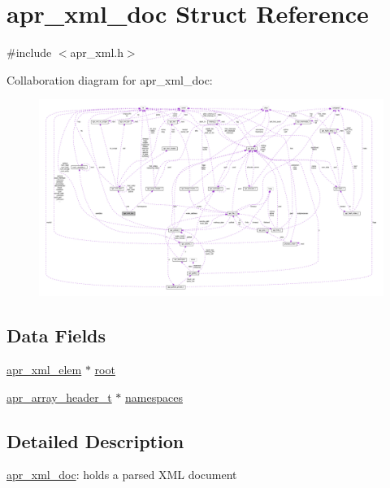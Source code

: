 \hypertarget{structapr__xml__doc}{}\section{apr\+\_\+xml\+\_\+doc Struct Reference}
\label{structapr__xml__doc}


{\ttfamily \#include $<$apr\+\_\+xml.\+h$>$}



Collaboration diagram for apr\+\_\+xml\+\_\+doc\+:
\nopagebreak
\begin{figure}[H]
\begin{center}
\leavevmode
\includegraphics[width=350pt]{structapr__xml__doc__coll__graph}
\end{center}
\end{figure}
\subsection*{Data Fields}
\begin{DoxyCompactItemize}
\item 
\hyperlink{structapr__xml__elem}{apr\+\_\+xml\+\_\+elem} $\ast$ \hyperlink{structapr__xml__doc_a9385ccf062ed6997d2d59d80cda28a71}{root}
\item 
\hyperlink{structapr__array__header__t}{apr\+\_\+array\+\_\+header\+\_\+t} $\ast$ \hyperlink{structapr__xml__doc_a6aee4d0e4516c9b8191ad734c2748d39}{namespaces}
\end{DoxyCompactItemize}


\subsection{Detailed Description}
\hyperlink{structapr__xml__doc}{apr\+\_\+xml\+\_\+doc}\+: holds a parsed X\+ML document 

